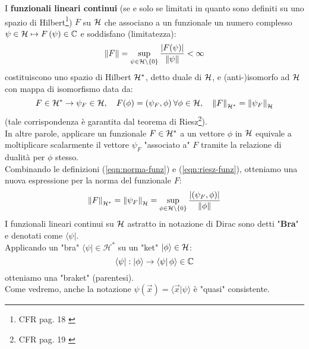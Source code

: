 \documentclass[FisicaTeorica.tex]{subfiles}
\begin{document}
I \textbf{funzionali lineari continui} (se e solo se limitati in quanto sono definiti su uno spazio di Hilbert\footnote{CFR pag. 18 \cite{spazi_hilbert}}) $F$ su $\mathcal{H}$ che associano a un funzionale un numero complesso $\psi\in\mathcal{H}\mapsto F\left(\psi\right)\in \mathbb{C}$ e soddisfano (limitatezza):
\begin{equation}
    \left\lVert F\right\rVert = \sup_{\psi \in \mathcal{H}\setminus \{0\}} \frac{|F(\psi)|}{\left\lVert\psi\right\rVert} < \infty
    \label{eqn:norma-funz}
\end{equation}
costituiscono uno spazio di Hilbert $\mathcal{H}^*$, detto duale di $\mathcal{H}$, e (anti-)isomorfo ad $\mathcal{H}$ con mappa di isomorfismo data da:
\begin{equation}
F\in \mathcal{H}^*\rightarrow \psi_F\in \mathcal{H}, \quad F(\phi) = (\psi_F, \phi)\> \forall \phi \in \mathcal{H}, \quad \left\lVert F\right\rVert_{\mathcal{H}^*}=\left\lVert\psi_F\right\rVert_{\mathcal{H}}
\label{eqn:riesz-funz}
\end{equation}
(tale corrispondenza è garantita dal teorema di Riesz\footnote{CFR pag. 19 \cite{spazi_hilbert}}).\\
In altre parole, applicare un funzionale $F \in \mathcal{H}^*$ a un vettore $\phi$ in $\mathcal{H}$ equivale a moltiplicare scalarmente il vettore $\psi_F$ "associato a" $F$ tramite la relazione di dualità per $\phi$ stesso.\\
Combinando le definizioni (\ref{eqn:norma-funz}) e (\ref{eqn:riesz-funz}), otteniamo una nuova espressione per la norma del funzionale $F$: 
\begin{equation}
\left\lVert F\right\rVert_{\mathcal{H}^*} = \left\lVert\psi_F\right\rVert_{\mathcal{H}} = \sup_{\phi\in\mathcal{H} \setminus \{0\}} \frac{|(\psi_F,\phi)|}{\left\lVert\phi\right\rVert}
\label{eqn:normafunz}
\end{equation}
I funzionali lineari continui su $\mathcal{H}$ astratto in notazione di Dirac sono detti "\textbf{Bra}" e denotati come $\langle\psi|$.\\
Applicando un "bra" $\langle \psi |\in \mathcal{H}^*$ su un "ket" $\left|\phi\right\rangle\in \mathcal{H}$:
\[
\left\langle\psi\right|:\left|\phi\right\rangle\rightarrow \left\langle\psi\right|\phi \rangle \in \mathbb{C}
\]
otteniamo una "braket" (parentesi).\\ 
Come vedremo, anche la notazione $\psi \left(\vec{x}\right)=\langle \vec{x}|\psi \rangle$  è "quasi" consistente.\\
\end{document}
